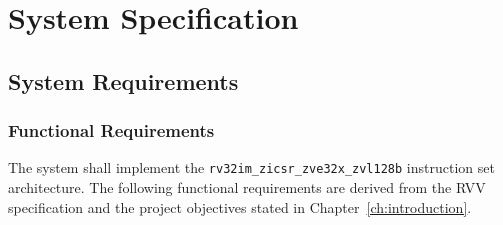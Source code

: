 \chapter{System Specification}
\label{ch:specification}

\section{System Requirements}
\label{sec:requirements}

\subsection{Functional Requirements}

The system shall implement the \texttt{rv32im\_zicsr\_zve32x\_zvl128b} instruction set
architecture. The following functional requirements are derived from the RVV
specification \cite{rvv-spec-1-0} and the project objectives stated in
Chapter~\ref{ch:introduction}.

